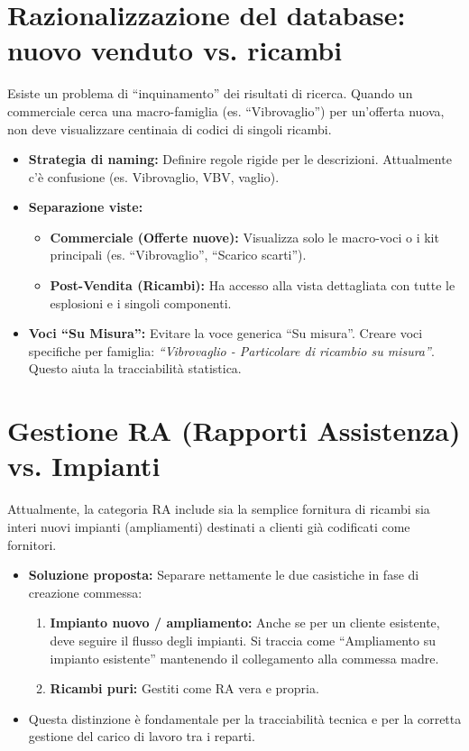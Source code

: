 \documentclass[12pt, a4paper]{article} %
\begin{document}
\section{Razionalizzazione del database: nuovo venduto vs. ricambi}
Esiste un problema di ``inquinamento'' dei risultati di ricerca. Quando un commerciale cerca una macro-famiglia (es. ``Vibrovaglio'') per un'offerta nuova, non deve visualizzare centinaia di codici di singoli ricambi.

\begin{itemize}
    \item \textbf{Strategia di naming:} Definire regole rigide per le descrizioni. Attualmente c'è confusione (es. Vibrovaglio, VBV, vaglio).
    \item \textbf{Separazione viste:}
    \begin{itemize}
        \item \textbf{Commerciale (Offerte nuove):} Visualizza solo le macro-voci o i kit principali (es. ``Vibrovaglio'', ``Scarico scarti'').
        \item \textbf{Post-Vendita (Ricambi):} Ha accesso alla vista dettagliata con tutte le esplosioni e i singoli componenti.
    \end{itemize}
    \item \textbf{Voci ``Su Misura'':} Evitare la voce generica ``Su misura''. Creare voci specifiche per famiglia: \textit{``Vibrovaglio - Particolare di ricambio su misura''}. Questo aiuta la tracciabilità statistica.
\end{itemize}

\section{Gestione RA (Rapporti Assistenza) vs. Impianti}
Attualmente, la categoria RA include sia la semplice fornitura di ricambi sia interi nuovi impianti (ampliamenti) destinati a clienti già codificati come fornitori.

\begin{itemize}
    \item \textbf{Soluzione proposta:} Separare nettamente le due casistiche in fase di creazione commessa:
    \begin{enumerate}
        \item \textbf{Impianto nuovo / ampliamento:} Anche se per un cliente esistente, deve seguire il flusso degli impianti. Si traccia come ``Ampliamento su impianto esistente'' mantenendo il collegamento alla commessa madre.
        \item \textbf{Ricambi puri:} Gestiti come RA vera e propria.
    \end{enumerate}
    \item Questa distinzione è fondamentale per la tracciabilità tecnica e per la corretta gestione del carico di lavoro tra i reparti.
\end{itemize}
\end{document}
